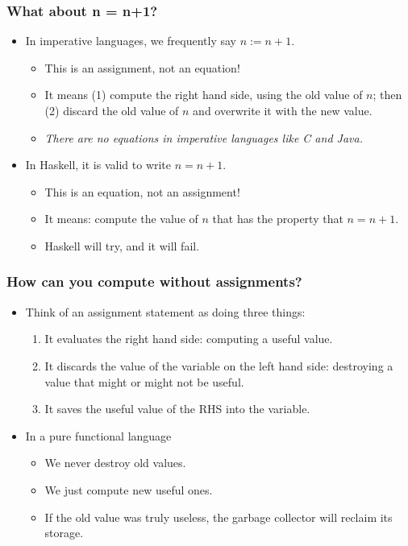 \documentclass{beamer}
\begin{document}
\begin{frame}
\frametitle{What about n = n+1?}

\begin{itemize}
\item In imperative languages, we frequently say $n := n+1$.
  \begin{itemize}
  \item This is an assignment, not an equation!
  \item It means (1) compute the right hand side, using the old
    value of $n$; then (2) discard the old value of $n$ and
    overwrite it with the new value.
  \item \emph{There are no equations in imperative languages like C
      and Java.}
  \end{itemize}
\item In Haskell, it is valid to write $n = n+1$.
  \begin{itemize}
  \item This is an equation, not an assignment!
  \item It means: compute the value of $n$ that has the property
    that $n = n+1$.
  \item Haskell will try, and it will fail.
\end{itemize}
\end{itemize}

\end{frame}




\begin{frame}
\frametitle{How can you compute without assignments?}

\begin{itemize}
\item Think of an assignment statement as doing three things:
  \begin{enumerate}
  \item It evaluates the right hand side: computing a useful value.
  \item It discards the value of the variable on the left hand
    side: destroying a value that might or might not be useful.
  \item It saves the useful value of the RHS into the variable.
  \end{enumerate}
\item In a pure functional language
  \begin{itemize}
  \item We never destroy old values.
  \item We just compute new useful ones.
  \item If the old value was truly useless, the garbage collector
    will reclaim its storage.
  \end{itemize}
\end{itemize}

\end{frame}
\end{document}
